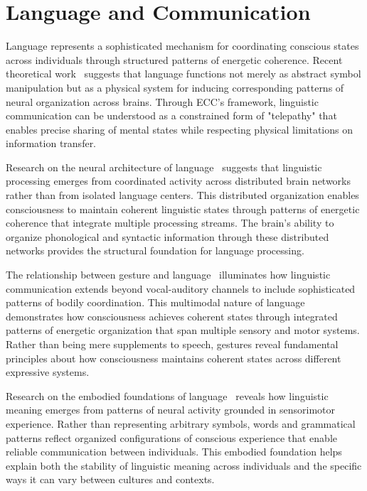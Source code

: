 \section{Language and Communication}

Language represents a sophisticated mechanism for coordinating conscious states across individuals through structured patterns of energetic coherence. Recent theoretical work~\cite{Feldman2008, pinotsis2023cytoelectric} suggests that language functions not merely as abstract symbol manipulation but as a physical system for inducing corresponding patterns of neural organization across brains. Through ECC's framework, linguistic communication can be understood as a constrained form of "telepathy" that enables precise sharing of mental states while respecting physical limitations on information transfer.


Research on the neural architecture of language~\cite{Pulvermuller2002, amil2024theta} suggests that linguistic processing emerges from coordinated activity across distributed brain networks rather than from isolated language centers. This distributed organization enables consciousness to maintain coherent linguistic states through patterns of energetic coherence that integrate multiple processing streams. The brain's ability to organize phonological and syntactic information through these distributed networks provides the structural foundation for language processing.

The relationship between gesture and language~\cite{GoldinMeadow2003, hunt2024electromagnetic, McNeill2005} illuminates how linguistic communication extends beyond vocal-auditory channels to include sophisticated patterns of bodily coordination. This multimodal nature of language demonstrates how consciousness achieves coherent states through integrated patterns of energetic organization that span multiple sensory and motor systems. Rather than being mere supplements to speech, gestures reveal fundamental principles about how consciousness maintains coherent states across different expressive systems.


Research on the embodied foundations of language~\cite{Barsalou2008, kukushkin2024massed, Lakoff1999} reveals how linguistic meaning emerges from patterns of neural activity grounded in sensorimotor experience. Rather than representing arbitrary symbols, words and grammatical patterns reflect organized configurations of conscious experience that enable reliable communication between individuals. This embodied foundation helps explain both the stability of linguistic meaning across individuals and the specific ways it can vary between cultures and contexts.

